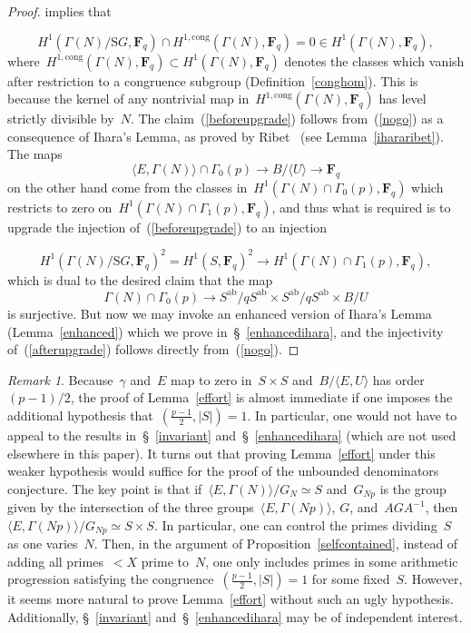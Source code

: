 \documentclass[10pt]{amsart}
\def\ab{\mathrm{ab}}
\def\Gbox{G^{\square}}
\def\Gbox{\mathrm{S}G}
\def\Hcong{H^{1,\mathrm{cong}}}
\def\SSSS{\S}
\def\F{\mathbf{F}}
\theoremstyle{remark}
\newtheorem{remark}[subsubsection]{Remark}
\numberwithin{equation}{subsection}
\def\numequation{\addtocounter{subsubsection}{1}\begin{equation}}
\begin{document}
\begin{proof}
implies that
\numequation \label{nogo}
H^1(\Gamma(N)/\Gbox,\F_q) \cap \Hcong(\Gamma(N),\F_q) = 0 \in H^1(\Gamma(N),\F_q),
\end{equation}
where~$\Hcong(\Gamma(N),\F_q) \subset H^1(\Gamma(N),\F_q)$ denotes
the classes which vanish after restriction to a congruence subgroup (Definition~\ref{conghom}).
This is because the kernel of any nontrivial map in~$ \Hcong(\Gamma(N),\F_q)$
has level strictly divisible by~$N$.
The claim~(\ref{beforeupgrade})  follows from~(\ref{nogo}) as a consequence
of Ihara's Lemma, as proved by Ribet~\cite{RibetICM} (see Lemma~\ref{ihararibet}).
The maps
$$ \langle E, \Gamma(N)\rangle \cap \Gamma_0(p)  \rightarrow B/\langle U \rangle \rightarrow \F_q$$
on the other hand come from the classes in~$H^1(\Gamma(N) \cap \Gamma_0(p),\F_q)$
which restricts to zero on~$H^1(\Gamma(N) \cap \Gamma_1(p),\F_q)$,
and thus what is required is to upgrade  the injection of~(\ref{beforeupgrade}) to an injection
 \numequation \label{afterupgrade}
 H^1(\Gamma(N)/\Gbox,\F_q)^{2} = H^1(S,\F_q)^2  \rightarrow 
H^1(\Gamma(N) \cap \Gamma_1(p),\F_q),
\end{equation}
which is dual to the desired claim that the map
$$\Gamma(N) \cap \Gamma_0(p) \rightarrow S^{\ab}/q S^{\ab} \times S^{\ab}/q S^{\ab} \times
B/U$$
is surjective.
But now we may invoke an enhanced version of Ihara's Lemma (Lemma~\ref{enhanced})
which we prove in~\SSSS~\ref{enhancedihara}, and  the injectivity of~(\ref{afterupgrade})
follows
directly from~(\ref{nogo}).
\end{proof}

\begin{remark} 
Because~$\gamma$ and~$E$ map to zero in~$S \times S$ and~$B/\langle E,U \rangle$ has order~$(p-1)/2$,
the proof of Lemma~\ref{effort} is almost immediate if one imposes the additional hypothesis
 that~$\left( \frac{p-1}{2}, |S|\right) = 1$. In particular, one would not have to appeal to the
 results in~\SSSS~\ref{invariant} and~\SSSS~\ref{enhancedihara} (which are not used elsewhere in this paper).
It turns out that proving Lemma~\ref{effort} under this weaker hypothesis would suffice for the proof of the unbounded denominators conjecture.
The key point is that if~$\langle E,\Gamma(N) \rangle/G_N \simeq S$ and~$G_{Np}$ is the group 
given by the intersection of the three groups~$\langle E,\Gamma(Np) \rangle$, $G$, and~$A G A^{-1}$, then~$\langle E,\Gamma(Np) \rangle/G_{Np} \simeq S \times S$. In particular, one can control the primes dividing~$S$ as one varies~$N$. Then, in the argument of Proposition~\ref{selfcontained}, instead of adding all primes~$< X$ prime to~$N$, one
 only includes  primes in some arithmetic progression
satisfying the congruence~$\left( \frac{p-1}{2}, |S|\right) = 1$ for some fixed~$S$.
However, it seems more natural to prove Lemma~\ref{effort} without such an ugly hypothesis.  Additionally, \SSSS~\ref{invariant} and~\SSSS~\ref{enhancedihara} may be of independent interest.
\end{remark}
\end{document}
